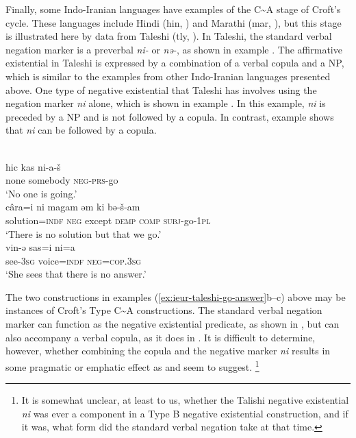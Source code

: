 \documentclass[output=paper]{langsci/langscibook}
\begin{document}
Finally, some Indo-Iranian languages have examples of the
C{\textasciitilde}A stage of Croft's cycle. These languages include
Hindi (hin, \citealt{Bashir2006}) and Marathi (mar,
\citealt{Croft1991}), but this stage is illustrated here by data from
Taleshi (tly, \citealt{Paul2011}). In Taleshi, the standard
verbal negation marker is a preverbal \textit{ni-} or
\textit{nə-}, as shown in example . The affirmative
existential in Taleshi is expressed by a combination of a verbal copula and
a NP, which is similar to the examples from other Indo-Iranian languages
presented above. One type of negative existential that Taleshi has involves
using the negation marker \textit{ni} alone, which is shown in example
. In this example, \textit{ni} is preceded
by a NP and is not followed by a copula. In contrast, example
 shows that \textit{ni} can be followed
by a copula.
%
\begin{exe}\ex\label{ex:ieur-taleshi-go-answer}
\begin{xlist}
\ex\label{ex:ieur-taleshi-nobodygoes}
\\
    \gll hic kas ni-a-š \\
none somebody \textsc{neg}-\textsc{prs}-go \\
    \glt
`No one is going.'
\ex\label{ex:ieur-taleshi-nosolution}
\\
\gll câra=i ni magam əm ki bə-š-am\\
solution=\textsc{indf} \textsc{neg} except \textsc{demp} \textsc{comp}
\textsc{subj}-go-\textsc{1pl}\\
\glt `There is no solution but that we go.'
\ex\label{ex:ieur-taleshi-noanswer}
\\
\gll vin-ə sas=i ni=a\\
see-\textsc{3sg} voice=\textsc{indf}  \textsc{neg=cop.3sg}\\
\glt `She sees that there is no answer.'
    \end{xlist}\end{exe}

The two constructions in examples (\ref{ex:ieur-taleshi-go-answer}b--c)
above may be instances of Croft's Type C{\textasciitilde}A constructions.
The standard verbal negation marker can function as the negative
existential predicate, as shown in , but can
also accompany a verbal copula, as it does in
. It is difficult to determine, however,
whether combining the copula and the negative marker \textit{ni} results in
some pragmatic or emphatic effect as \citet{Croft1991} and
\citet{Veselinova2014} seem to suggest.%
%
\footnote{It is somewhat unclear, at least to us, whether the Talishi negative existential \textit{ni} was ever a component in a Type B negative existential construction, and if it was, what form did the standard verbal negation take at that time.}
\end{document}
